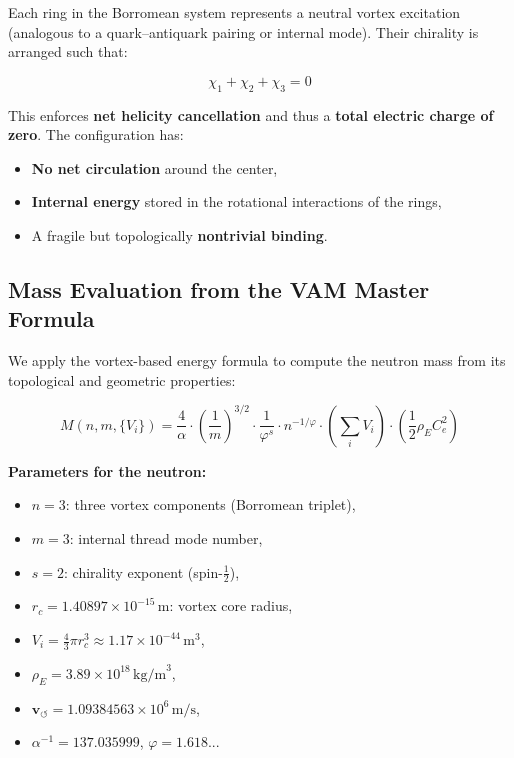 \documentclass[preprint]{revtex4-2}
\begin{document}
Each ring in the Borromean system represents a neutral vortex excitation (analogous to a quark–antiquark pairing or internal mode). Their chirality is arranged such that:

\[
\chi_1 + \chi_2 + \chi_3 = 0
\]

This enforces \textbf{net helicity cancellation} and thus a \textbf{total electric charge of zero}. The configuration has:

\begin{itemize}
    \item \textbf{No net circulation} around the center,
    \item \textbf{Internal energy} stored in the rotational interactions of the rings,
    \item A fragile but topologically \textbf{nontrivial binding}.
\end{itemize}

\subsection{Mass Evaluation from the VAM Master Formula}

We apply the vortex-based energy formula to compute the neutron mass from its topological and geometric properties:

\begin{equation}
\boxed{
M(n, m, \{V_i\}) = \frac{4}{\alpha} \cdot \left( \frac{1}{m} \right)^{3/2} \cdot \frac{1}{\varphi^s} \cdot n^{-1/\varphi} \cdot \left( \sum_i V_i \right) \cdot \left( \frac{1}{2} \rho_{\scriptscriptstyle\boldsymbol\!E}C_e^2 \right)
}
\end{equation}

\noindent
\textbf{Parameters for the neutron:}
\begin{itemize}
    \item \(n = 3\): three vortex components (Borromean triplet),
    \item \(m = 3\): internal thread mode number,
    \item \(s = 2\): chirality exponent (spin-\(\frac{1}{2}\)),
    \item \(r_c = 1.40897 \times 10^{-15} \, \text{m}\): vortex core radius,
    \item \(V_i = \frac{4}{3} \pi r_c^3 \approx 1.17 \times 10^{-44} \, \text{m}^3\),
    \item \(\rho_{\scriptscriptstyle\boldsymbol\!E}= 3.89 \times 10^{18} \, \text{kg/m}^3\),
    \item \(\mathbf{v}_{\scriptscriptstyle\boldsymbol{\circlearrowleft}} = 1.09384563 \times 10^6 \, \text{m/s}\),
    \item \(\alpha^{-1} = 137.035999\), \quad \(\varphi = 1.618...\)
\end{itemize}
\end{document}

